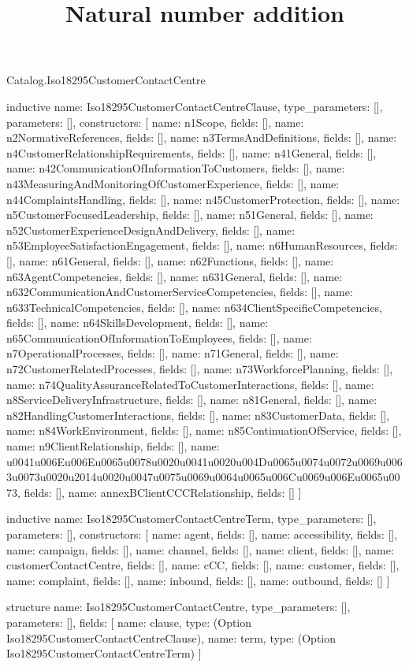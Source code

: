 \begin{lexlean}{Catalog.Iso18295CustomerContactCentre}
\title{Natural number addition}
\begin{semanticmodule}
inductive{
  name: Iso18295CustomerContactCentreClause,
  type_parameters: [],
  parameters: [],
  constructors: [
    {name: n1Scope, fields: []},
    {name: n2NormativeReferences, fields: []},
    {name: n3TermsAndDefinitions, fields: []},
    {name: n4CustomerRelationshipRequirements, fields: []},
    {name: n41General, fields: []},
    {name: n42CommunicationOfInformationToCustomers, fields: []},
    {name: n43MeasuringAndMonitoringOfCustomerExperience, fields: []},
    {name: n44ComplaintsHandling, fields: []},
    {name: n45CustomerProtection, fields: []},
    {name: n5CustomerFocusedLeadership, fields: []},
    {name: n51General, fields: []},
    {name: n52CustomerExperienceDesignAndDelivery, fields: []},
    {name: n53EmployeeSatisfactionEngagement, fields: []},
    {name: n6HumanResources, fields: []},
    {name: n61General, fields: []},
    {name: n62Functions, fields: []},
    {name: n63AgentCompetencies, fields: []},
    {name: n631General, fields: []},
    {name: n632CommunicationAndCustomerServiceCompetencies, fields: []},
    {name: n633TechnicalCompetencies, fields: []},
    {name: n634ClientSpecificCompetencies, fields: []},
    {name: n64SkillsDevelopment, fields: []},
    {name: n65CommunicationOfInformationToEmployees, fields: []},
    {name: n7OperationalProcesses, fields: []},
    {name: n71General, fields: []},
    {name: n72CustomerRelatedProcesses, fields: []},
    {name: n73WorkforcePlanning, fields: []},
    {name: n74QualityAssuranceRelatedToCustomerInteractions, fields: []},
    {name: n8ServiceDeliveryInfrastructure, fields: []},
    {name: n81General, fields: []},
    {name: n82HandlingCustomerInteractions, fields: []},
    {name: n83CustomerData, fields: []},
    {name: n84WorkEnvironment, fields: []},
    {name: n85ContinuationOfService, fields: []},
    {name: n9ClientRelationship, fields: []},
    {name: u0041u006Eu006Eu0065u0078u0020u0041u0020u004Du0065u0074u0072u0069u0063u0073u0020u2014u0020u0047u0075u0069u0064u0065u006Cu0069u006Eu0065u0073, fields: []},
    {name: annexBClientCCCRelationship, fields: []}
  ]
}

inductive{
  name: Iso18295CustomerContactCentreTerm,
  type_parameters: [],
  parameters: [],
  constructors: [
    {name: agent, fields: []},
    {name: accessibility, fields: []},
    {name: campaign, fields: []},
    {name: channel, fields: []},
    {name: client, fields: []},
    {name: customerContactCentre, fields: []},
    {name: cCC, fields: []},
    {name: customer, fields: []},
    {name: complaint, fields: []},
    {name: inbound, fields: []},
    {name: outbound, fields: []}
  ]
}

structure{
  name: Iso18295CustomerContactCentre,
  type_parameters: [],
  parameters: [],
  fields: [
    {name: clause, type: (Option Iso18295CustomerContactCentreClause)},
    {name: term, type: (Option Iso18295CustomerContactCentreTerm)}
  ]
}
\end{semanticmodule}
\end{lexlean}
